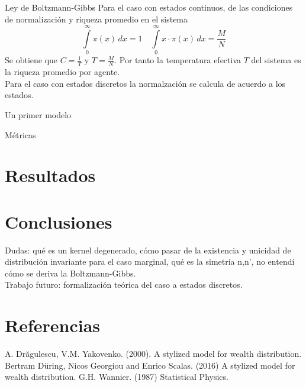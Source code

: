 \begin{frame}{Ley de Boltzmann-Gibbs}
    Para el caso con estados continuos, de las condiciones de normalización y riqueza promedio en el sistema
    \[
    \int\limits_{0}^{\infty}\pi(x)\, dx = 1 \quad \int\limits_{0}^{\infty} x \cdot \pi(x)\, dx = \frac{M}{N}
    \]
    Se obtiene que $C= \frac{1}{T}$ y $T = \frac{M}{N}$. Por tanto la temperatura efectiva $T$ del sistema es la riqueza promedio por agente.\\
    Para el caso con estados discretos la normalzación se calcula de acuerdo a los estados.
\end{frame}
\begin{frame}{Un primer modelo}
    
\end{frame}
\begin{frame}{Métricas}
    
\end{frame}


\section{Resultados}


\section{Conclusiones}
\begin{frame}
    Dudas: qué es un kernel degenerado, cómo pasar de la existencia y unicidad de distribución invariante para el caso marginal, qué es la simetría n,n', no entendí cómo se deriva la Boltzmann-Gibbs.\\
   Trabajo futuro: formalización teórica del caso a estados discretos.
\end{frame}
\section{Referencias}

\begin{frame}
\begin{thebibliography}{}
     A. Dr\u{a}gulescu, V.M. Yakovenko. (2000). A stylized model for wealth distribution. 
     Bertram Düring, Nicos Georgiou and Enrico Scalas. (2016) A stylized model for wealth distribution. 
     G.H. Wannier. (1987) Statistical Physics.
\end{thebibliography}
\end{frame}

\maketitle



